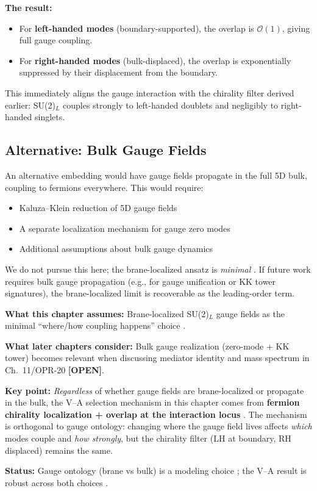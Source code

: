 \textbf{The result:}
\begin{itemize}[nosep]
    \item For \textbf{left-handed modes} (boundary-supported), the overlap is
          $\mathcal{O}(1)$, giving full gauge coupling.
    \item For \textbf{right-handed modes} (bulk-displaced), the overlap is
          exponentially suppressed by their displacement from the boundary.
\end{itemize}

This immediately aligns the gauge interaction with the chirality filter derived
earlier: SU(2)$_L$ couples strongly to left-handed doublets and negligibly to
right-handed singlets.

\subsection{Alternative: Bulk Gauge Fields}

An alternative embedding would have gauge fields propagate in the full 5D bulk,
coupling to fermions everywhere. This would require:
\begin{itemize}[nosep]
    \item Kaluza--Klein reduction of 5D gauge fields
    \item A separate localization mechanism for gauge zero modes
    \item Additional assumptions about bulk gauge dynamics
\end{itemize}
We do not pursue this here; the brane-localized ansatz is \emph{minimal} \tagP{}.
If future work requires bulk gauge propagation (e.g., for gauge unification or
KK tower signatures), the brane-localized limit is recoverable as the leading-order term.

\begin{tcolorbox}[colback=yellow!5!white, colframe=yellow!60!black,
    title=\textbf{Model Choice: Brane Gauge vs Bulk Gauge}]
\textbf{What this chapter assumes:} Brane-localized SU(2)$_L$ gauge fields
as the minimal ``where/how coupling happens'' choice \tagP{}.

\textbf{What later chapters consider:} Bulk gauge realization (zero-mode + KK
tower) becomes relevant when discussing mediator identity and mass spectrum
in Ch.~11/OPR-20 \textbf{[OPEN]}.

\textbf{Key point:} \emph{Regardless} of whether gauge fields are brane-localized
or propagate in the bulk, the V--A selection mechanism in this chapter comes
from \textbf{fermion chirality localization + overlap at the interaction locus}
\tagDc{}. The mechanism is orthogonal to gauge ontology: changing where the
gauge field lives affects \emph{which} modes couple and \emph{how strongly},
but the chirality filter (LH at boundary, RH displaced) remains the same.

\textbf{Status:} Gauge ontology (brane vs bulk) is a modeling choice \tagP{};
the V--A result is robust across both choices \tagDc{}.
\end{tcolorbox}


